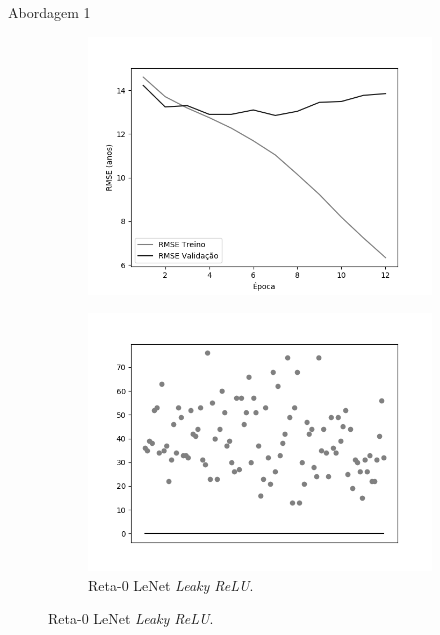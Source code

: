 \begin{frame}{Abordagem 1}
\begin{figure}[h!]
\begin{subfigure}[hb]{0.25\linewidth}
    \includegraphics[width=\linewidth]{img/graficos/history/lenet/fig-history-image-treat-1-lenet-lrelu-rmse.png}
  \end{subfigure}
  \begin{subfigure}[hb]{0.25\linewidth}
    \caption{Reta-0 LeNet \emph{Leaky ReLU}.}

   \includegraphics[width=0.25\linewidth]{img/graficos/reta0/lenet/fig-reta-0-image-treat-1-lenet-lrelu.png}
  \end{subfigure}%
\end{figure}
\end{frame}
